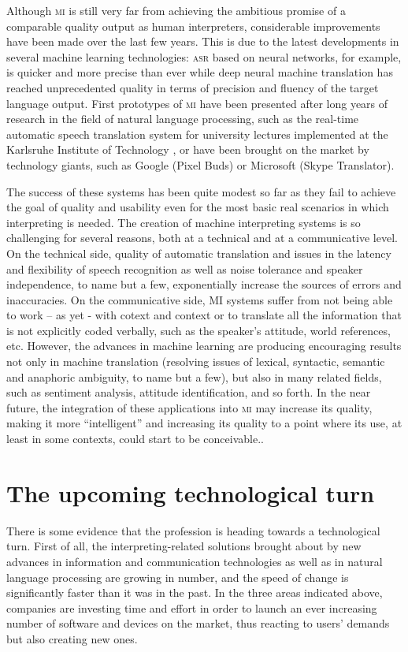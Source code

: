 \documentclass[output=paper]{langsci/langscibook}
\begin{document}
Although \textsc{mi} is still very far from achieving  the ambitious promise of a comparable quality output as human interpreters, considerable improvements have been made over the last few years. This is due to the latest developments in several machine learning technologies: \textsc{asr} based on neural networks, for example, is quicker and more precise than ever while deep neural machine translation has reached unprecedented quality in terms of precision and fluency of the target language output. First prototypes of \textsc{mi} have been presented after long years of research in the field of natural language processing, such as the real-time automatic speech translation system for university lectures implemented at the Karlsruhe Institute of Technology \citep{muller_lecture_2016}, or have been brought on the market by technology giants, such as Google (Pixel Buds) or Microsoft (Skype Translator).  
 
The success of these systems has been quite modest so far as they fail to achieve the goal of quality and usability even for the most basic real scenarios in which interpreting is needed. The creation of machine interpreting systems is so challenging for several reasons, both at a technical and at a communicative level. On the technical side, quality of automatic translation and issues in the latency and flexibility of speech recognition as well as noise tolerance and speaker independence, to name but a few, exponentially increase the sources of errors and inaccuracies. On the communicative side, \textsc{MI} systems suffer from not being able to work – as yet - with cotext and context or to translate all the information that is not explicitly coded verbally, such as the speaker's attitude, world references, etc. However, the advances in machine learning are producing encouraging results not only in machine translation (resolving issues of lexical, syntactic, semantic and anaphoric ambiguity, to name but a few), but also in many related fields, such as sentiment analysis, attitude identification, and so forth. In the near future, the integration of these applications into \textsc{mi} may increase its quality, making it more ``intelligent'' and increasing its quality to a point where its use, at least in some contexts, could start to be conceivable..
 
\section{The upcoming technological turn} 
There is some evidence that the profession is heading towards a technological turn. First of all, the interpreting-related solutions brought about by new advances in information and communication technologies as well as in natural language processing are growing in number, and the speed of change is significantly faster than it was in the past. In the three areas indicated above, companies are investing time and effort in order to launch an ever increasing number of software and devices on the market, thus reacting to users’ demands but also creating new ones.
 
\end{document}

